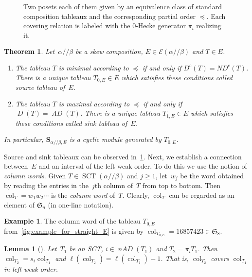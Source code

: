 \documentclass[10pt]{amsart}
\theoremstyle{plain}
\newtheorem{theo}[theo]{Theorem}
\theoremstyle{plain}
\newtheorem{lemma}[lemma]{Lemma}
\theoremstyle{plain}
\theoremstyle{plain}
\theoremstyle{plain}
\theoremstyle{definition}
\theoremstyle{definition}
\newtheorem{exam}[exam]{Example}
\newcommand{\bs}[1]{\boldsymbol{#1} }
\newcommand{\mc}[1]{\mathcal{#1} }
\newcommand{\D}{\operatorname{\mathit{D}}}
\newcommand{\DC}{\operatorname{\mathit{D^c}}}
\newcommand{\AD}{\operatorname{\mathit{AD}}}
\newcommand{\nAD}{\operatorname{\mathit{nAD}}}
\newcommand{\ND}{\operatorname{\mathit{ND^c}}}
\DeclareMathOperator{\SCT}{SCT}
\newcommand{\fS}{\mathfrak{S}}
\newcommand{\fs}{s}
\newcommand{\col}{\operatorname{col}}
\newcommand{\ab}{{\alpha / \! \! / \beta}}
\newcommand{\pleq}{\preceq}
\newcommand{\sse}{\bs S_{\ab,E}}
\begin{document}
\begin{figure}[htb]
{{\begin{tikzpicture}
		\end{tikzpicture} 

	}		\label{fig:example_for_skew_E}
}
		\caption{%
			Two posets each of them given by an equivalence class of standard composition tableaux and the corresponding partial order $\pleq$.
			Each covering relation is labeled with the 0-Hecke generator $\pi_i$ realizing it.
		}
		\label{fig:example_for_E}
\end{figure}
\endgroup


\begin{theo}
	\label{thm:source_and_sink_tableau}
	 Let~$\ab$ be a skew composition, $E\in \mc E(\ab)$ and $T\in E$.
	\begin{enumerate}
		\item The tableau $T$ is minimal according to $\pleq$ if and only if $\DC(T)= \ND(T)$. There is a unique tableau $T_{0,E}\in E$ which satisfies these conditions called \emph{source tableau} of~$E$.
		\item The tableau $T$ is maximal according to $\pleq$ if and only if $\D(T)= \AD(T)$. There is a unique tableau $T_{1,E}\in E$ which satisfies these conditions called \emph{sink tableau} of~$E$.
	\end{enumerate}
	In particular, $\sse$ is a cyclic module generated by $T_{0,E}$.
\end{theo}

Source and sink tableaux can be observed in~\cref{fig:example_for_E}. Next, we establish a connection between~$E$ and an interval of the left weak order. To do this we use the notion of \emph{column words}.
 Given $T\in \SCT(\ab)$ and $j\geq 1$, let~$w_j$ be the word obtained by reading the entries in the~$j$th column of~$T$ from top to bottom. Then $\col_T= w_1 w_2 \cdots$ is the \emph{column word} of~$T$. Clearly, $\col_T$ can be regarded as an element of $\fS_n$ (in one-line notation).
 
\begin{exam}
	The column word of the tableau $T_{0,E}$ from~\cref{fig:example_for_straight_E} is given by $\col_{T_{0,E}} = 16857423\in \fS_8$.
\end{exam}

\begin{lemma}[{\cite[Lemma~4.4]{Tewari2015}}]
	\label{thm:tableaux_cover_impies_column_words_cover}
	Let~$T_1$ be an SCT, $i\in \nAD(T_1)$ and $T_2 = \pi_i T_1$. Then $\col_{T_2} = \fs_i \col_{T_1}$ and $\ell(\col_{T_2}) = \ell(\col_{T_1}) + 1$. That is, $\col_{T_2}$ covers $\col_{T_1}$ in left weak order.
\end{lemma}
\end{document}
